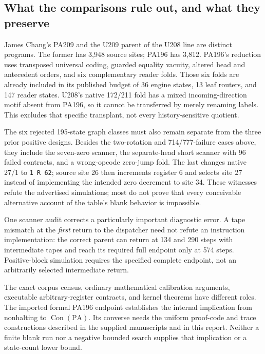 \subsection{What the comparisons rule out, and what they preserve}

James Chang's PA209 and the U209 parent of the U208 line are distinct programs.
The former has 3,948 source sites; PA196 has 3,812. PA196's reduction uses
transposed universal coding, guarded equality vacuity, altered head and
antecedent orders, and six complementary reader folds. Those six folds are
already included in its published budget of 36 engine states, 13 leaf routers,
and 147 reader states. U208's native 172/211 fold has a mixed incoming-direction
motif absent from PA196, so it cannot be transferred by merely renaming labels.
This excludes that specific transplant, not every history-sensitive quotient.

The six rejected 195-state graph classes must also remain separate from the
three prior positive designs. Besides the two-rotation and 714/777-failure
cases above, they include the seven-zero scanner, the separate-head short
scanner with 96 failed contracts, and a wrong-opcode zero-jump fold. The last
changes native 27/1 to \texttt{1 R 62}; source site 26 then increments register
6 and selects site 27 instead of implementing the intended zero decrement to
site 34. These witnesses refute the advertised simulations; most do not prove
that every conceivable alternative account of the table's blank behavior is
impossible.

One scanner audit corrects a particularly important diagnostic error. A tape
mismatch at the \emph{first} return to the dispatcher need not refute an
instruction implementation: the correct parent can return at 134 and 290
steps with intermediate tapes and reach its required full endpoint only at
574 steps. Positive-block simulation requires the specified complete endpoint,
not an arbitrarily selected intermediate return.

The exact corpus census, ordinary mathematical calibration arguments,
executable arbitrary-register contracts, and kernel theorems have different
roles. The imported formal PA196 endpoint establishes the internal implication
from nonhalting to $\operatorname{Con}(\mathrm{PA})$. Its converse needs the
uniform proof-code and trace constructions described in the supplied
manuscripts and in this report. Neither a finite blank run nor a negative
bounded search supplies that implication or a state-count lower bound.
